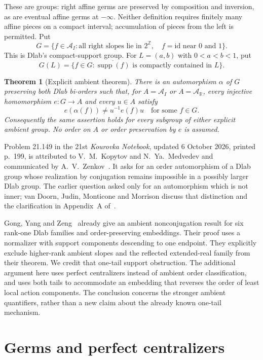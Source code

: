 \documentclass[10pt]{article}
\newtheorem{theorem}{Theorem}
\theoremstyle{definition}
\newcommand{\R}{\mathbb R}
\newcommand{\Z}{\mathbb Z}
\newcommand{\id}{\mathrm{id}}
\newcommand{\supp}{\operatorname{supp}}
\newcommand{\AI}{\mathcal A_I}
\newcommand{\AR}{\mathcal A_{\R}}
\begin{document}
These are groups: right affine germs are preserved by composition and
inversion, as are eventual affine germs at $-\infty$. Neither definition
requires finitely many affine pieces on a compact interval; accumulation
of pieces from the left is permitted. Put
\[
 G=\{f\in\AI:\text{all right slopes lie in }2^{\Z},\quad
 f=\id\text{ near }0\text{ and }1\}.
\]
This is Dlab's compact-support group. For $L=(a,b)$ with
$0<a<b<1$, put
\[
 G(L)=\{f\in G:\overline{\supp(f)}\text{ is compactly contained in }L\}.
\]

\begin{theorem}[Explicit ambient theorem]\label{thm:main}
There is an automorphism $\alpha$ of $G$ preserving both Dlab bi-orders
such that, for $A=\AI$ or $A=\AR$, every injective homomorphism
$e:G\longrightarrow A$ and every $u\in A$ satisfy
\[
 e(\alpha(f))\ne u^{-1}e(f)u\quad\text{for some }f\in G.
\]
Consequently the same assertion holds for every subgroup of either
explicit ambient group. No order on $A$ or order preservation by $e$ is
assumed.
\end{theorem}

Problem 21.149 in the 21st \emph{Kourovka Notebook}, updated
6 October 2026, printed p.~199, is attributed to V.~M.~Kopytov and
N.~Ya.~Medvedev and communicated by A.~V.~Zenkov~\cite{KN}.
It asks for an order automorphism of a Dlab group whose realization by
conjugation remains impossible in a possibly larger Dlab group. The
earlier question asked only for an automorphism which is not inner;
van Doorn, Judin, Monticone and Morrison discuss that distinction and
the clarification in Appendix~A of~\cite{VDJMM}.

Gong, Yang and Zeng~\cite[Theorem~1.1]{GYZ} already give an ambient
nonconjugation result for six rank-one Dlab families and order-preserving
embeddings. Their proof uses a normalizer with support components
descending to one endpoint. They explicitly exclude higher-rank ambient
slopes and the reflected extended-real family from their theorem. We
credit that one-tail support obstruction. The additional argument here
uses perfect centralizers instead of ambient order classification, and
uses both tails to accommodate an embedding that reverses the order
of least local action components. The conclusion concerns the stronger ambient quantifiers, rather than
a new claim about the already known one-tail mechanism.

\section{Germs and perfect centralizers}
\end{document}
